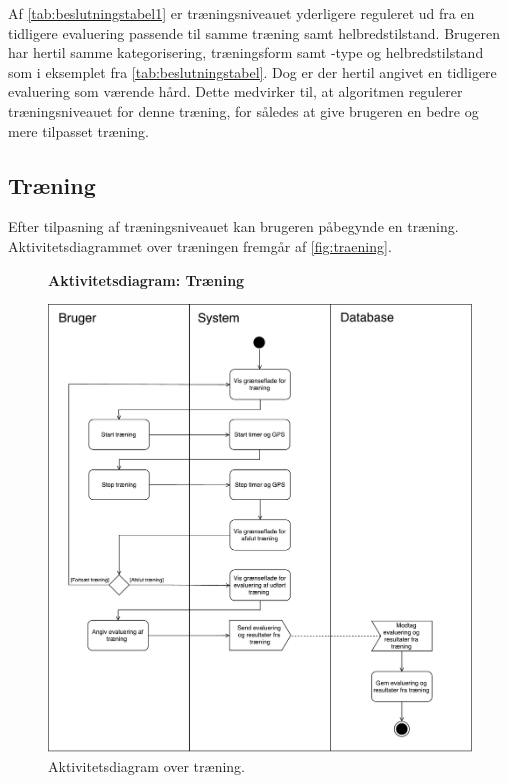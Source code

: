 \noindent
Af \autoref{tab:beslutningstabel1} er træningsniveauet yderligere reguleret ud fra en tidligere evaluering passende til samme træning samt helbredstilstand. Brugeren har hertil samme kategorisering, træningsform samt -type og helbredstilstand som i eksemplet fra \autoref{tab:beslutningstabel}. Dog er der hertil angivet en tidligere evaluering som værende hård. Dette medvirker til, at algoritmen regulerer træningsniveauet for denne træning, for således at give brugeren en bedre og mere tilpasset træning.


\subsection*{Træning} \label{sec:traening}
Efter tilpasning af træningsniveauet kan brugeren påbegynde en træning. Aktivitetsdiagrammet over træningen fremgår af \autoref{fig:traening}. 

\begin{figure} [H]
\centering
\textbf{Aktivitetsdiagram: Træning}\par\medskip
\includegraphics[width=1\textwidth]{figures/aktivitetsdiagram/Traening}
\caption{Aktivitetsdiagram over træning.}
\label{fig:traening}
\end{figure}

